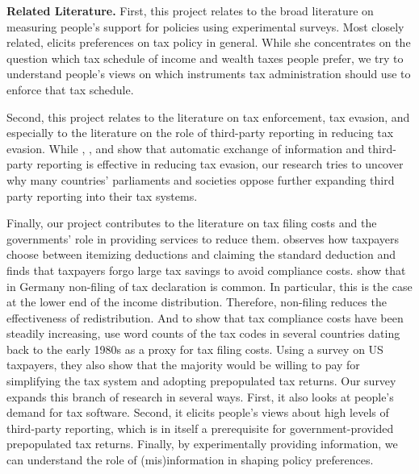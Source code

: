 \documentclass[12pt]{article}
\begin{document}


\textbf{Related Literature.}
First, this project relates to the broad literature on measuring people's support for policies using experimental surveys. Most closely related, \textcite{stantcheva2021understanding} elicits preferences on tax policy in general. While she concentrates on the question which tax schedule of income and wealth taxes people prefer, we try to understand people's views on which instruments tax administration should use to enforce that tax schedule. 

Second, this project relates to the literature on tax enforcement, tax evasion, and especially to the literature on the role of third-party reporting in reducing tax evasion. While \textcite{kleven2011unwilling}, \textcite{pomeranz2015no}, \textcite{slemrod2017does} and \textcite{boas2024taxing} show that automatic exchange of information and third-party reporting is effective in reducing tax evasion, our research tries to uncover why many countries' parliaments and societies oppose further expanding third party reporting into their tax systems. 

Finally, our project contributes to the literature on tax filing costs and the governments' role in providing services to reduce them. \textcite{benzarti2020taxing} observes how taxpayers choose between itemizing deductions and claiming the standard deduction and finds that taxpayers forgo large tax savings to avoid compliance costs. \textcite{hauck2024optional} show that in Germany non-filing of tax declaration is common. In particular, this is the case at the lower end of the income distribution. Therefore, non-filing reduces the effectiveness of redistribution. And to show that tax compliance costs have been steadily increasing, \textcite{benzarti2024rising} use word counts of the tax codes in several countries dating back to the early 1980s as a proxy for tax filing costs. Using a survey on US taxpayers, they also show that the majority would be willing to pay for simplifying the tax system and adopting prepopulated tax returns. Our survey expands this branch of research in several ways. First, it also looks at people's demand for tax software. Second, it elicits people's views about high levels of third-party reporting, which is in itself a prerequisite for government-provided prepopulated tax returns. Finally, by experimentally providing information, we can understand the role of (mis)information in shaping policy preferences. 
\printbibliography
\end{document}
